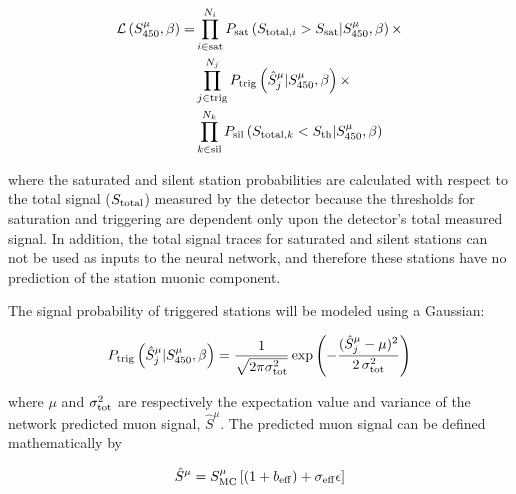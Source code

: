 \begin{align}
  \mathcal{L}\left(S^{\mu}_{450}, \beta\right) = & \prod_{i \in \rm sat}^{N_{i}} P_{\rm sat}\left(S_{\text{total}, i} > S_{\rm sat} | S^{\mu}_{450}, \beta\right) \times \nonumber\\
   & \prod_{j \in \rm trig}^{N_{j}} P_{\rm trig}\left(\hat{S}^{\mu}_{j} | S^{\mu}_{450}, \beta\right) \times \nonumber\\
   & \prod_{k \in \rm sil}^{N_{k}} P_{\rm sil}\left(S_{\text{total}, k} < S_{\rm th}| S^{\mu}_{450}, \beta\right) \label{eq:likelihood}
\end{align}

\noindent
where the saturated and silent station probabilities are calculated with respect to the total signal ($S_{\rm total}$) measured by the detector because the thresholds for saturation and triggering are dependent only upon the detector's total measured signal.
In addition, the total signal traces for saturated and silent stations can not be used as inputs to the neural network, and therefore these stations have no prediction of the station muonic component.

The signal probability of triggered stations will be modeled using a Gaussian:

\begin{equation}
  P_{\rm trig}\left(\hat{S}^{\mu}_{j} | S^{\mu}_{450}, \beta\right) = \frac{1}{\sqrt{2\pi\sigma_{\rm tot}^{2}}}\exp\left( - \frac{(\hat{S}^{\mu}_{j} - \mu)^{2}}{2\,\sigma_{\rm tot}^{2}}\right) \label{eg:triggered}
\end{equation}

\noindent
where $\mu$ and $\sigma_{\rm tot}^{2}$ are respectively the expectation value and variance of the network predicted muon signal, $\hat{S}^{\mu}$.
The predicted muon signal can be defined mathematically by

\begin{equation}
  \hat{S}^{\mu} = S^{\mu}_{\rm MC} \left[\left(1 + b_{\rm eff}\right) + \sigma_{\rm eff}\epsilon\right] \label{eq:muon_signal_prediction_math}
\end{equation}

